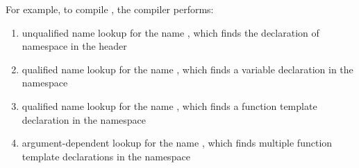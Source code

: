 \begin{example}
For example, to compile , the compiler performs:
\begin{enumerate}
\item unqualified name lookup for the name , which finds the declaration of namespace  in the header 
\item qualified name lookup for the name , which finds a variable declaration in the namespace 
\item qualified name lookup for the name , which finds a function template declaration in the namespace 
\item argument-dependent lookup for the name , which finds multiple function template declarations in the namespace 
\end{enumerate}
\end{example}
